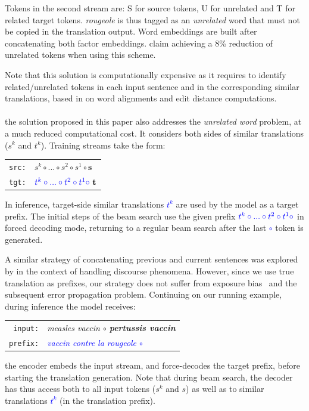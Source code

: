 Tokens in the second stream are: S for source tokens, U for unrelated and T for related target tokens. {\it rougeole} is thus tagged as an {\it unrelated} word that must not be copied in the translation output.
Word embeddings are built after concatenating both factor embeddings.
%
\citet{xu20boosting} claim achieving a 8\% reduction of unrelated tokens when using this scheme.

Note that this solution is computationally expensive as it requires to identify related/unrelated tokens in each input sentence and in the corresponding similar translations, based in \citet{xu20boosting} on word alignments and edit distance computations.

\paragraph{} the solution proposed in this paper also addresses the {\em unrelated word} problem, at a much reduced computational cost. It considers both sides of similar translations ($s^k$ and $t^k$). Training streams take the form:

\begin{center}
\begin{tabular}{rl}
\texttt{src:} & $s^{k} \circ ... \circ s^{2} \circ s^{1} \circ \textbf{s}$ \\
\texttt{tgt:} & $\textcolor{blue}{t^{k} \circ ... \circ t^{2} \circ t^{1} \circ}\ \textbf{t}$ \\
\end{tabular}
\end{center}
\noindent In inference, target-side similar translations \textcolor{blue}{$t^k$} are used by the model as a target prefix. The initial steps of the beam search use the given prefix $\textcolor{blue}{t^{k} \circ ... \circ t^{2} \circ t^{1} \circ}$ in forced decoding mode, returning to a regular beam search after the last \textcolor{blue}{$\circ$} token is generated.

A similar strategy of concatenating previous and current sentences was explored by \citet{tiedemann17neural} in the context of handling discourse phenomena.
However, since we use true translation as prefixes, our strategy does not suffer from exposure bias~\cite{Ranzato15sequence} and the subsequent error propagation problem.
%
Continuing on our running example, during inference the model receives:
\begin{center}
\begin{tabular}{rl}
\texttt{input:} & \it measles vaccin $\circ$ {\bf pertussis vaccin} \\ 
\texttt{prefix:} & \it \textcolor{blue}{vaccin contre la rougeole $\circ$} \\
\end{tabular}
\end{center}
\noindent the encoder embeds the input stream, and force-decodes the target prefix,  before starting the translation generation. Note that during beam search, the decoder has thus access both to all input tokens ($s^k$ and $s$) as well as to similar translations \textcolor{blue}{$t^k$} (in the translation prefix). 

